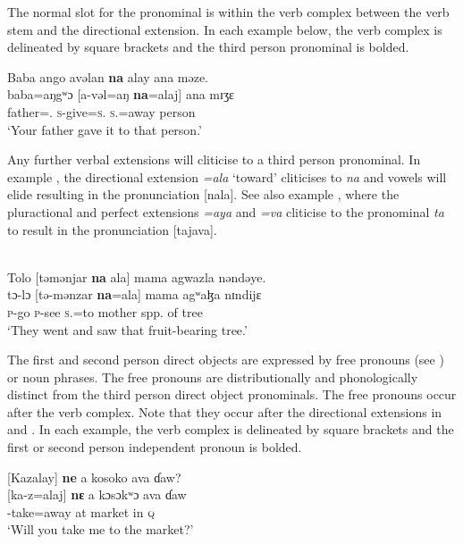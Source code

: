 The normal slot for the \DO pronominal is within the verb complex between the verb stem and the directional extension. In each example below, the verb complex is delineated by square brackets and the third person \DO pronominal is bolded.

\ea\label{ex:7:37}
Baba  ango  avəlan  \textbf{na}  alay  ana  məze.\\
\gll baba=aŋgʷɔ  [a-vəl=aŋ  \textbf{na}=alaj]  ana  mɪʒɛ\\
father={\twoS}.{\POSS}  \textsc{s}-give=\textsc{s}.{\IO}  \textsc{s}.{\DO}=away    {\DAT} person\\
\glt ‘Your father gave it to that person.’  
\z

Any further verbal extensions will cliticise to a third person \DO pronominal. In example , the directional extension \textit{=ala} ‘toward’ cliticises to \textit{na} and vowels will elide resulting in the pronunciation [nala]. See also example , where the pluractional and perfect extensions \textit{=}\textit{aya} and \textit{=}\textit{va} cliticise to the \DO pronominal \textit{ta} to result in the pronunciation [tajava].  


\ea\label{ex:7:38}\\
Tolo  [təmənjar  \textbf{na}  ala]  mama  agwazla  nəndəye.\\
\gll tɔ{}-lɔ    [tə-mənzar  \textbf{na}=ala] mama  agʷaɮa   nɪndijɛ\\
\textsc{p}-go  \textsc{p}-see   \textsc{s}.{\DO}=to  mother  {spp. of tree}  {\DEM}\\
\glt ‘They went and saw that fruit-bearing tree.’
\z

\largerpage
The first and second person direct objects are expressed by free pronouns (see ) or noun phrases. The free pronouns are distributionally and phonologically distinct from the third person direct object pronominals. The free pronouns occur after the verb complex. Note that they occur after the directional extensions in  and . In each example, the verb complex is delineated by square brackets and the first or second person independent pronoun is bolded.

\ea\label{ex:7:39}
[Kazalay]  \textbf{ne}  a  kosoko  ava  ɗaw?\\
\gll {}[ka-z=alaj]    \textbf{nɛ}  a  kɔsɔkʷɔ  ava  ɗaw\\
{\twoS}-take=away    {\oneS}  at  market  in  {\textsc{q}}\\
\glt ‘Will you take me to the market?’
\z


